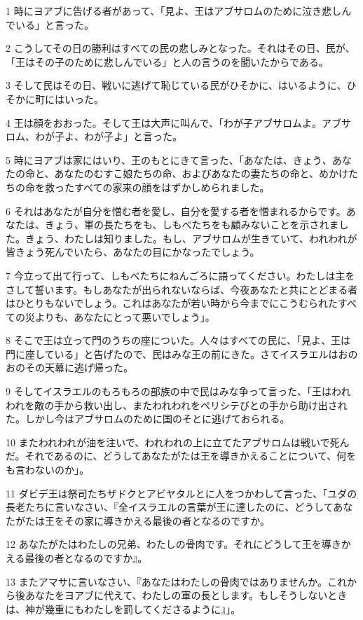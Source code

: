 \par 1 時にヨアブに告げる者があって、「見よ、王はアブサロムのために泣き悲しんでいる」と言った。
\par 2 こうしてその日の勝利はすべての民の悲しみとなった。それはその日、民が、「王はその子のために悲しんでいる」と人の言うのを聞いたからである。
\par 3 そして民はその日、戦いに逃げて恥じている民がひそかに、はいるように、ひそかに町にはいった。
\par 4 王は顔をおおった。そして王は大声に叫んで、「わが子アブサロムよ。アブサロム、わが子よ、わが子よ」と言った。
\par 5 時にヨアブは家にはいり、王のもとにきて言った、「あなたは、きょう、あなたの命と、あなたのむすこ娘たちの命、およびあなたの妻たちの命と、めかけたちの命を救ったすべての家来の顔をはずかしめられました。
\par 6 それはあなたが自分を憎む者を愛し、自分を愛する者を憎まれるからです。あなたは、きょう、軍の長たちをも、しもべたちをも顧みないことを示されました。きょう、わたしは知りました。もし、アブサロムが生きていて、われわれが皆きょう死んでいたら、あなたの目にかなったでしょう。
\par 7 今立って出て行って、しもべたちにねんごろに語ってください。わたしは主をさして誓います。もしあなたが出られないならば、今夜あなたと共にとどまる者はひとりもないでしょう。これはあなたが若い時から今までにこうむられたすべての災よりも、あなたにとって悪いでしょう」。
\par 8 そこで王は立って門のうちの座についた。人々はすべての民に、「見よ、王は門に座している」と告げたので、民はみな王の前にきた。さてイスラエルはおのおのその天幕に逃げ帰った。
\par 9 そしてイスラエルのもろもろの部族の中で民はみな争って言った、「王はわれわれを敵の手から救い出し、またわれわれをペリシテびとの手から助け出された。しかし今はアブサロムのために国のそとに逃げておられる。
\par 10 またわれわれが油を注いで、われわれの上に立てたアブサロムは戦いで死んだ。それであるのに、どうしてあなたがたは王を導きかえることについて、何をも言わないのか」。
\par 11 ダビデ王は祭司たちザドクとアビヤタルとに人をつかわして言った、「ユダの長老たちに言いなさい、『全イスラエルの言葉が王に達したのに、どうしてあなたがたは王をその家に導きかえる最後の者となるのですか。
\par 12 あなたがたはわたしの兄弟、わたしの骨肉です。それにどうして王を導きかえる最後の者となるのですか』。
\par 13 またアマサに言いなさい、『あなたはわたしの骨肉ではありませんか。これから後あなたをヨアブに代えて、わたしの軍の長とします。もしそうしないときは、神が幾重にもわたしを罰してくださるように』」。
